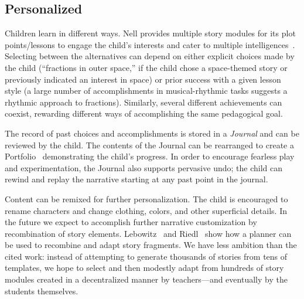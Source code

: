 \documentclass{sig-alternate}
\begin{document}

\subsection{Personalized}


Children learn in different ways.  Nell provides multiple
story modules for its plot points/lessons to engage the child's
interests and cater to multiple intelligences~\cite{gardner:mi}.
Selecting between the alternatives can depend on either explicit
choices made by the child (``fractions in outer space,'' if the child
chose a space-themed story or previously indicated an interest in space)
or prior success with a given
lesson style (a large number of accomplishments in musical-rhythmic
tasks suggests a rhythmic approach to fractions).  Similarly, several
different achievements can coexist, rewarding different ways of
accomplishing the same pedagogical goal.

The record of past choices and accomplishments is stored in a
\textit{Journal} and can be reviewed by the child.  The contents of the
Journal can be rearranged to create a Portfolio~\cite{stefanakis:portfolios}
demonstrating the child's progress.
In order to encourage fearless play and experimentation, the Journal
also supports pervasive undo; the child can rewind and replay the
narrative starting at any past point in the journal.

Content can be remixed for further personalization.
The child is encouraged to rename characters and change clothing,
colors, and other superficial details.  In the future
we expect to accomplish further narrative customization by
recombination of story elements.
Lebowitz~\cite{lebowitz:universe85} and Riedl~\cite{riedl:planning}
show how a planner can be used to recombine and adapt story fragments.
We have less ambition than the cited work: instead of
attempting to generate thousands of stories from tens of templates, we
hope to select and then modestly adapt from hundreds of story
modules created in a decentralized manner by teachers---and eventually
by the students themselves.
\end{document}

